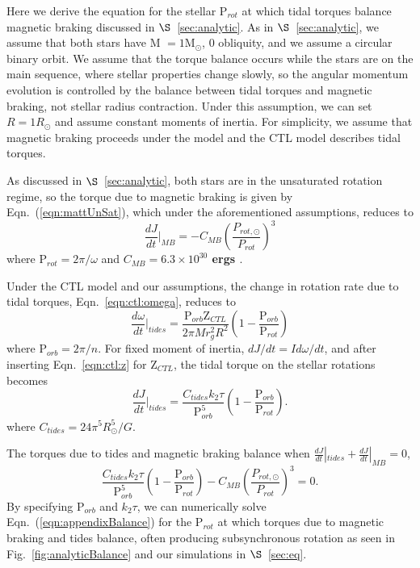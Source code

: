 \documentclass[twocolumn]{aastex61}
\newcommand{\xxx}[1]{{\textbf{#1}}}
\begin{document}
Here we derive the equation for the stellar P$_{rot}$ at which tidal torques balance magnetic braking discussed in $\S$~\ref{sec:analytic}. As in $\S$~\ref{sec:analytic}, we assume that both stars have M $= 1$M$_{\odot}$, 0 obliquity, and we assume a circular binary orbit. We assume that the torque balance occurs while the stars are on the main sequence, where stellar properties change slowly, so the angular momentum evolution is controlled by the balance between tidal torques and magnetic braking, not stellar radius contraction. Under this assumption, we can set $R = 1 R_{\odot}$ and assume constant moments of inertia. For simplicity, we assume that magnetic braking proceeds under the \citet{Matt2015} model and the CTL model describes tidal torques.

As discussed in $\S$~\ref{sec:analytic}, both stars are in the unsaturated rotation regime, so the torque due to magnetic braking is given by Eqn.~(\ref{eqn:mattUnSat}), which under the aforementioned assumptions, reduces to
\begin{equation}
    \frac{dJ}{dt}\Bigg|_{MB} = -C_{MB} \left( \frac{P_{rot,\odot}}{P_{rot}} \right)^3
\end{equation}
where P$_{rot} = 2 \pi / \omega$ and \xxx{$C_{MB} = 6.3 \times 10^{30}$ ergs \citep{Matt2015,Matt2019}}.

Under the CTL model and our assumptions, the change in rotation rate due to tidal torques, Eqn.~\ref{eqn:ctl:omega}, reduces to 
\begin{equation}
    \frac{d\omega}{dt}\Bigg|_{tides} = \frac{\mathrm{P}_{orb}\mathrm{Z}_{CTL}}{2 \pi M r_g^2 R^2}\left( 1 - \frac{\mathrm{P}_{orb}}{\mathrm{P}_{rot}} \right)
\end{equation}
where P$_{orb} = 2 \pi/n$.  For fixed moment of inertia, $dJ/dt =I d\omega/dt$, and after inserting Eqn.~\ref{eqn:ctl:z} for Z$_{CTL}$, the tidal torque on the stellar rotations becomes
\begin{equation}
    \frac{dJ}{dt}\Bigg|_{tides} = \frac{C_{tides} k_2 \tau}{\mathrm{P}_{orb}^5}\left( 1 - \frac{\mathrm{P}_{orb}}{\mathrm{P}_{rot}} \right).
\end{equation}
where $C_{tides} = 24 \pi^5 R_{\odot}^5 / G$. 

The torques due to tides and magnetic braking balance when $ \frac{dJ}{dt}|_{tides} +  \frac{dJ}{dt}|_{MB} = 0$, 
\begin{equation} \label{eqn:appendixBalance}
    \frac{C_{tides} k_2 \tau}{\mathrm{P}_{orb}^5}\left( 1 - \frac{\mathrm{P}_{orb}}{\mathrm{P}_{rot}} \right) -C_{MB} \left( \frac{P_{rot,\odot}}{P_{rot}} \right)^3 = 0.
\end{equation}
By specifying P$_{orb}$ and $k_2 \tau$, we can numerically solve Eqn.~(\ref{eqn:appendixBalance}) for the P$_{rot}$ at which torques due to magnetic braking and tides balance, often producing subsynchronous rotation as seen in Fig.~\ref{fig:analyticBalance} and our simulations in $\S$~\ref{sec:eq}.


\end{document}
